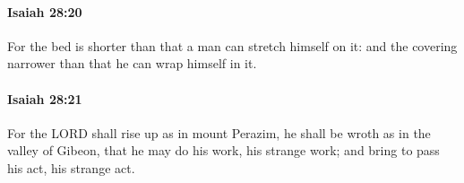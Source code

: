 		\paragraph{Isaiah 28:20} %
			\label{ISAIAH-28-20}

			For the bed is shorter than that a man can stretch himself on it: and the covering narrower than that he can wrap himself in it.


		\paragraph{Isaiah 28:21} %
			\label{ISAIAH-28-21}

			For the LORD shall rise up as in mount Perazim, he shall be wroth as in the valley of Gibeon, that he may do his work, his strange work; and bring to pass his act, his strange act.


